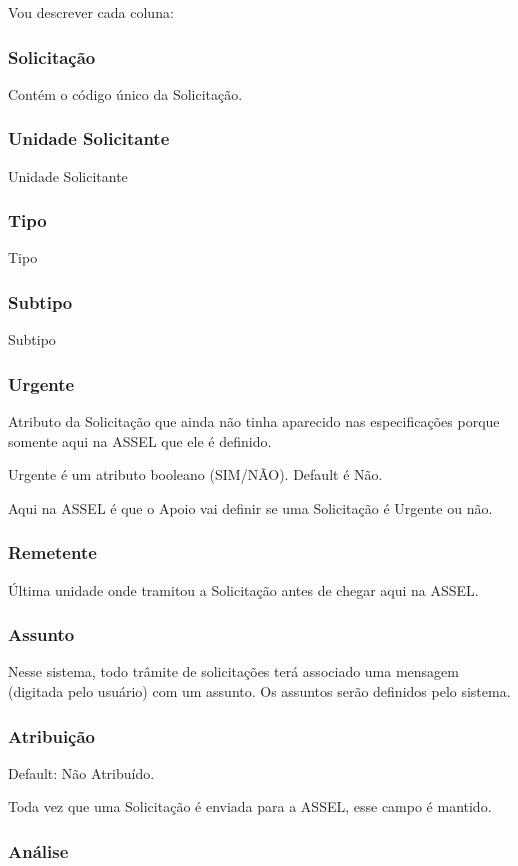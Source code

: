 		Vou descrever cada coluna:

		\subsubsection{Solicitação} 
			Contém o código único da Solicitação.
		\subsubsection{Unidade Solicitante} 
			Unidade Solicitante
		\subsubsection{Tipo} 
			Tipo
		\subsubsection{Subtipo} 
			Subtipo
		\subsubsection{Urgente} 
			Atributo da Solicitação que ainda não tinha aparecido nas especificações porque somente aqui na ASSEL que ele é definido.
			
			Urgente é um atributo booleano (SIM/NÃO). Default é Não.
			
			Aqui na ASSEL é que o Apoio vai definir se uma Solicitação é Urgente ou não.			
		\subsubsection{Remetente} 
			Última unidade onde tramitou a Solicitação antes de chegar aqui na ASSEL.
		\subsubsection{Assunto} 
			Nesse sistema, todo trâmite de solicitações terá associado uma mensagem (digitada pelo usuário) com um assunto. Os assuntos serão definidos pelo sistema.
			
		\subsubsection{Atribuição} 			
		
			Default: Não Atribuído.
			
			Toda vez que uma Solicitação é enviada para a ASSEL, esse campo é mantido.
			

			
		\subsubsection{Análise}
			
